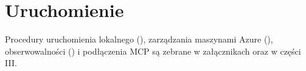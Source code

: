 \section{Uruchomienie}
Procedury uruchomienia lokalnego (), zarządzania maszynami Azure
(), obserwowalności () i podłączenia MCP są zebrane
w załącznikach oraz w części III.

